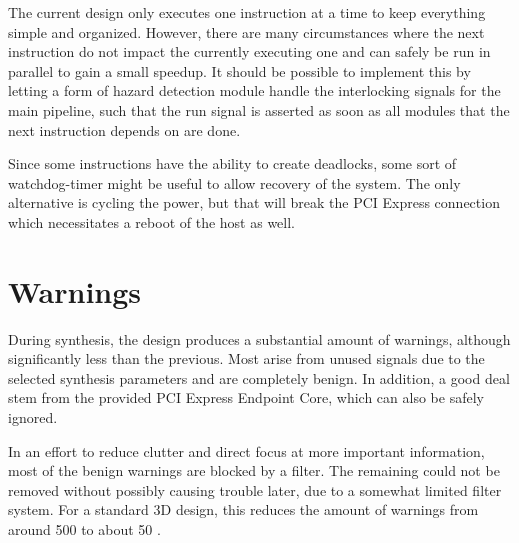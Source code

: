 The current design only executes one instruction at a time to keep everything simple and organized.
However, there are many circumstances where the next instruction do not impact the currently executing one and can safely be run in parallel to gain a small speedup.
It should be possible to implement this by letting a form of hazard detection module handle the interlocking signals for the main pipeline, such that the run signal is asserted as soon as all modules that the next instruction depends on are done.

Since some instructions have the ability to create deadlocks, some sort of watchdog-timer might be useful to allow recovery of the system.
The only alternative is cycling the power, but that will break the PCI Express connection which necessitates a reboot of the host as well.


\section{Warnings}

During synthesis, the design produces a substantial amount of warnings, although significantly less than the previous.
Most arise from unused signals due to the selected synthesis parameters and are completely benign.
In addition, a good deal stem from the provided PCI Express Endpoint Core, which can also be safely ignored.

In an effort to reduce clutter and direct focus at more important information, most of the benign warnings are blocked by a filter.
The remaining could not be removed without possibly causing trouble later, due to a somewhat limited filter system.
For a standard 3D design, this reduces the amount of warnings from around 500 to about 50 \footnotemark.

